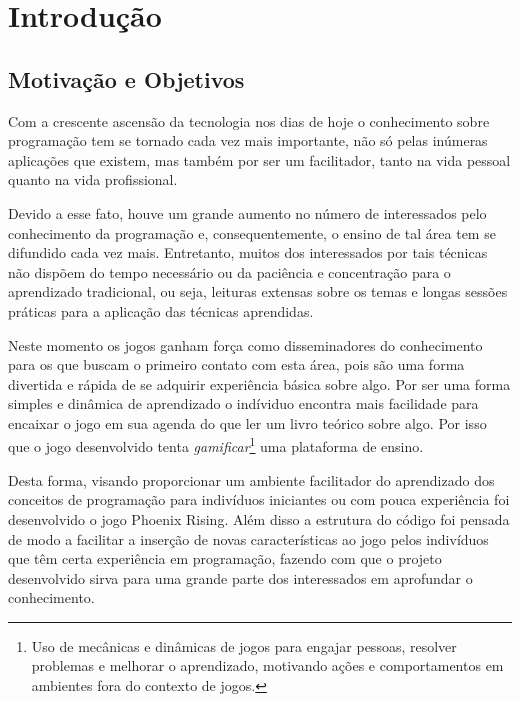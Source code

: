 \chapter{Introdução}
\label{cap:introducao}

\section{Motivação e Objetivos}

Com a crescente ascensão da tecnologia nos dias de hoje o conhecimento sobre
programação tem se tornado cada vez mais importante, não só pelas inúmeras
aplicações que existem, mas também por ser um facilitador, tanto na vida
pessoal quanto na vida profissional.

Devido a esse fato, houve um grande aumento no número de interessados pelo
conhecimento da programação e, consequentemente, o ensino de tal área tem se
difundido cada vez mais. Entretanto, muitos dos interessados por tais técnicas
não dispõem do tempo necessário ou da paciência e concentração para o 
aprendizado tradicional, ou seja, leituras extensas sobre os temas e longas 
sessões práticas para a aplicação das técnicas aprendidas.

Neste momento os jogos ganham força como disseminadores do conhecimento para os 
que buscam o primeiro contato com esta área, pois são
uma forma divertida e rápida de se adquirir experiência básica sobre algo.
Por ser uma forma simples e dinâmica de aprendizado o indíviduo encontra mais
facilidade para encaixar o jogo em sua agenda do que ler um livro teórico sobre
algo. Por isso que o jogo desenvolvido tenta \textit{gamificar}\footnote{Uso de 
mecânicas e dinâmicas de jogos para engajar pessoas, resolver problemas e 
melhorar o aprendizado, motivando ações e comportamentos em ambientes fora do 
contexto de jogos.} uma plataforma de ensino.

Desta forma, visando proporcionar um ambiente facilitador do aprendizado dos
conceitos de programação para indivíduos iniciantes ou com pouca experiência
foi desenvolvido o jogo Phoenix Rising. Além disso a estrutura do código foi
pensada de modo a facilitar a inserção de novas características ao jogo
pelos indivíduos que têm certa experiência em programação, fazendo com que
o projeto desenvolvido sirva para uma grande parte dos interessados em 
aprofundar o conhecimento.


